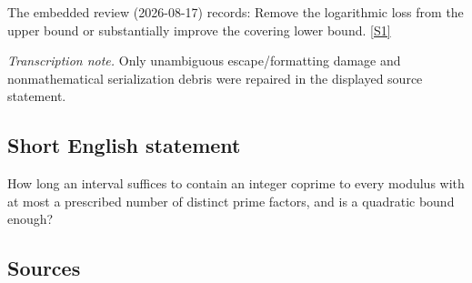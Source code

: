 \documentclass[11pt,a4paper]{article}
\newcommand{\sref}[2]{\hyperlink{source:#1:#2}{[S#2]}}
\begin{document}
The embedded review (2026-08-17) records: Remove the logarithmic loss from the upper bound or substantially improve the covering lower bound. \sref{statement}{1}

{\small\emph{Transcription note.} Only unambiguous escape/formatting damage and nonmathematical serialization debris were repaired in the displayed source statement.}

\subsection{Short English statement}

How long an interval suffices to contain an integer coprime to every modulus with at most a prescribed number of distinct prime factors, and is a quadratic bound enough?

\subsection{Sources}
\end{document}
